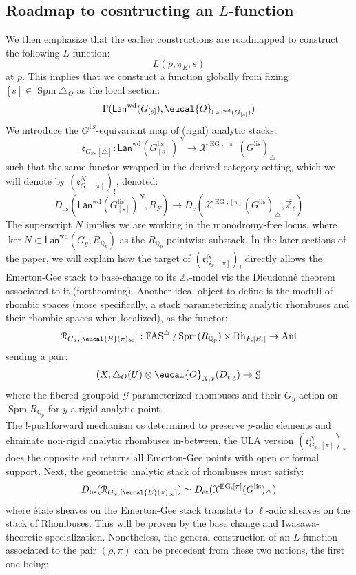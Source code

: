 \documentclass[9pt]{amsart}
\let\texcal\mathcal
\renewcommand{\[}{\begin{equation}}
\renewcommand{\]}{\end{equation}}
\newcommand{\on}{\operatorname}
\theoremstyle{plain}
\theoremstyle{remark}
\begin{document}
\subsection{Roadmap to cosntructing an $L$-function} We then emphasize that the earlier constructions are roadmapped to construct the following $L$-function:
\[L(\rho, \pi_E, s)\]
at $p$. This implies that we construct a function globally from fixing $[s] \in \on {Spm} \triangle_O$ as the local section:
\[\Gamma(\mathsf{Lan}^{\on{wd}}(G_{[s]}), \eucal{O}_{\mathsf{Lan}^{\on{wd}}(G_{[s]})})\]
We introduce the $G^{\on{lis}}$-equivariant map of (rigid) analytic stacks: 
\[\mathfrak{e}_{G_x, [\triangle]}: \mathsf{Lan}^{\on{wd}}(G^{\on{lis}}_{[s]})^N \to \texcal{X}^{\on{EG}, [\pi]}(G^{\on{lis}})_{\triangle}\]
such that the same functor wrapped in the derived category setting, which we will denote by $(\mathfrak{e}^N_{G_x, [\pi]})_!$, denoted:
\[D_{\on{lis}}(\mathsf{Lan}^{\on{wd}}(G^{\on{lis}}_{[s]})^N, R_F) \to D_c(\texcal{X}^{\on{EG}, [\pi]}(G^{\on{lis}})_{\triangle}, \overline{\mathbb{Z}_{\ell}})\]
The superscript $N$ implies we are working in the monodromy-free locus, where $\on{ker} N \subset \mathsf{Lan}^{\on{wd}}(G_y; R_{\mathbb{Q}_p})$ as the $R_{\mathbb{Q}_p}$-pointwise substack.
İn the later sections of the paper, we will explain how the target of $(\mathfrak{e}^N_{G_x, [\pi]})_!$ directly allows the Emerton-Gee stack to base-change to its $\mathbb{Z}_{\ell}$-model vis the Dieudonné theorem associated to it (forthcoming). 
Another ideal object to define is the moduli of rhombic spaces (more specifically, a stack parameterizing analytic rhombuses and their rhombic spaces when localized), as the functor:
\[\texcal{R}_{G_x, [\eucal{E}(\pi)_{\infty}]}: \on{FAS}^{\triangle}
/\on{Spm}(R_{\mathbb{Q}_p}) \times \on{Rh}_{F, [E_i]} \to \on{Ani}\]
sending a pair:
\[(X, \triangle_O(U) \otimes \eucal{O}_{X, x}(D_{\on{rig}}) \to \texcal{G}\]
where the fibered groupoid $\texcal{G}$ parameterized rhombuses and their $G_y$-action on $\on{Spm} R_{\mathbb{Q}_p}$ for $y$ a rigid analytic point.\\
The $!$-pushforward mechanism os determined to preserve $p$-adic elements and eliminate non-rigid analytic rhombuses in-between, the ULA version $(\mathfrak{e}^N_{G_x, [\pi]})_*$ does the opposite snd returns all Emerton-Gee points with open or formal support. Next, the geometric analytic stack of rhombuses must satisfy:
\[D_{\on{lis}}(\texcal{R}_{G_x, [\eucal{E}(\pi)_{\infty}]}) \simeq D_{\text{ét}}(\texcal{X}^{\on{EG}, [\pi]}(G^{\on{lis}})_{\triangle})\] where étale sheaves on the Emerton-Gee stack translate to $\ell$-adic sheaves on the stack of Rhombuses. This will be proven by the base change and Iwasawa-theoretic specialization. Nonetheless, the general construction of an $L$-function associated to the pair $(\rho, \pi)$ can be precedent from these two notions, the first one being: 
\end{document}
